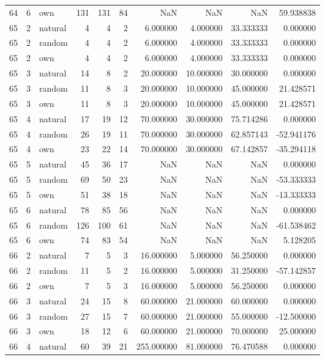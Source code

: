 \begin{table}[htbp]
\begin{tabular}{rrlrrrrrrr}
64 & 6 & own & 131 & 131 & 84 & NaN & NaN & NaN & 59.938838 \\
65 & 2 & natural & 4 & 4 & 2 & 6.000000 & 4.000000 & 33.333333 & 0.000000 \\
65 & 2 & random & 4 & 4 & 2 & 6.000000 & 4.000000 & 33.333333 & 0.000000 \\
65 & 2 & own & 4 & 4 & 2 & 6.000000 & 4.000000 & 33.333333 & 0.000000 \\
65 & 3 & natural & 14 & 8 & 2 & 20.000000 & 10.000000 & 30.000000 & 0.000000 \\
65 & 3 & random & 11 & 8 & 3 & 20.000000 & 10.000000 & 45.000000 & 21.428571 \\
65 & 3 & own & 11 & 8 & 3 & 20.000000 & 10.000000 & 45.000000 & 21.428571 \\
65 & 4 & natural & 17 & 19 & 12 & 70.000000 & 30.000000 & 75.714286 & 0.000000 \\
65 & 4 & random & 26 & 19 & 11 & 70.000000 & 30.000000 & 62.857143 & -52.941176 \\
65 & 4 & own & 23 & 22 & 14 & 70.000000 & 30.000000 & 67.142857 & -35.294118 \\
65 & 5 & natural & 45 & 36 & 17 & NaN & NaN & NaN & 0.000000 \\
65 & 5 & random & 69 & 50 & 23 & NaN & NaN & NaN & -53.333333 \\
65 & 5 & own & 51 & 38 & 18 & NaN & NaN & NaN & -13.333333 \\
65 & 6 & natural & 78 & 85 & 56 & NaN & NaN & NaN & 0.000000 \\
65 & 6 & random & 126 & 100 & 61 & NaN & NaN & NaN & -61.538462 \\
65 & 6 & own & 74 & 83 & 54 & NaN & NaN & NaN & 5.128205 \\
66 & 2 & natural & 7 & 5 & 3 & 16.000000 & 5.000000 & 56.250000 & 0.000000 \\
66 & 2 & random & 11 & 5 & 2 & 16.000000 & 5.000000 & 31.250000 & -57.142857 \\
66 & 2 & own & 7 & 5 & 3 & 16.000000 & 5.000000 & 56.250000 & 0.000000 \\
66 & 3 & natural & 24 & 15 & 8 & 60.000000 & 21.000000 & 60.000000 & 0.000000 \\
66 & 3 & random & 27 & 15 & 7 & 60.000000 & 21.000000 & 55.000000 & -12.500000 \\
66 & 3 & own & 18 & 12 & 6 & 60.000000 & 21.000000 & 70.000000 & 25.000000 \\
66 & 4 & natural & 60 & 39 & 21 & 255.000000 & 81.000000 & 76.470588 & 0.000000 \\

\end{tabular}
\end{table}
